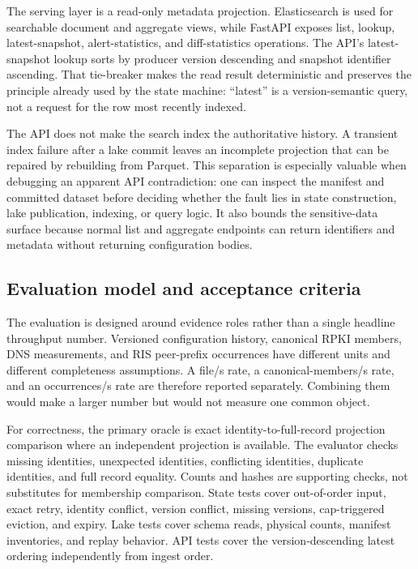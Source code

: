 \documentclass[a4paper,11pt]{article}
\begin{document}
The serving layer is a read-only metadata projection. Elasticsearch is used for searchable document and aggregate views, while FastAPI exposes list, lookup, latest-snapshot, alert-statistics, and diff-statistics operations. The API's latest-snapshot lookup sorts by producer version descending and snapshot identifier ascending. That tie-breaker makes the read result deterministic and preserves the principle already used by the state machine: ``latest'' is a version-semantic query, not a request for the row most recently indexed.

The API does not make the search index the authoritative history. A transient index failure after a lake commit leaves an incomplete projection that can be repaired by rebuilding from Parquet. This separation is especially valuable when debugging an apparent API contradiction: one can inspect the manifest and committed dataset before deciding whether the fault lies in state construction, lake publication, indexing, or query logic. It also bounds the sensitive-data surface because normal list and aggregate endpoints can return identifiers and metadata without returning configuration bodies.

\subsection{Evaluation model and acceptance criteria}

The evaluation is designed around evidence roles rather than a single headline throughput number. Versioned configuration history, canonical RPKI members, DNS measurements, and RIS peer-prefix occurrences have different units and different completeness assumptions. A file/s rate, a canonical-members/s rate, and an occurrences/s rate are therefore reported separately. Combining them would make a larger number but would not measure one common object.

For correctness, the primary oracle is exact identity-to-full-record projection comparison where an independent projection is available. The evaluator checks missing identities, unexpected identities, conflicting identities, duplicate identities, and full record equality. Counts and hashes are supporting checks, not substitutes for membership comparison. State tests cover out-of-order input, exact retry, identity conflict, version conflict, missing versions, cap-triggered eviction, and expiry. Lake tests cover schema reads, physical counts, manifest inventories, and replay behavior. API tests cover the version-descending latest ordering independently from ingest order.
\end{document}
